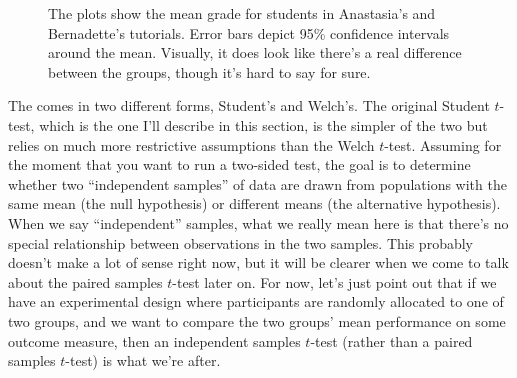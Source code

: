\begin{figure}[!!htp]
\begin{center}
\caption{The plots show the mean grade for students in Anastasia’s and Bernadette’s tutorials. Error bars depict 95\% confidence intervals around the mean. Visually, it does look like there's a real difference between the groups, though it's hard to say for sure.}
\HR
\label{fig:ttestci}
\end{center}
\end{figure}


The  comes in two different forms, Student's and Welch's. The original Student $t$-test, which is the one I'll describe in this section, is the simpler of the two but relies on much more restrictive assumptions than the Welch $t$-test. Assuming for the moment that you want to run a two-sided test, the goal is to determine whether two ``independent samples'' of data are drawn from populations with the same mean (the null hypothesis) or different means (the alternative hypothesis). When we say ``independent'' samples, what we really mean here is that there's no special relationship between observations in the two samples. This probably doesn't make a lot of sense right now, but it will be clearer when we come to talk about the paired samples $t$-test later on. For now, let's just point out that if we have an experimental design where participants are randomly allocated to one of two groups, and we want to compare the two groups' mean performance on some outcome measure, then an independent samples $t$-test (rather than a paired samples $t$-test) is what we're after.

